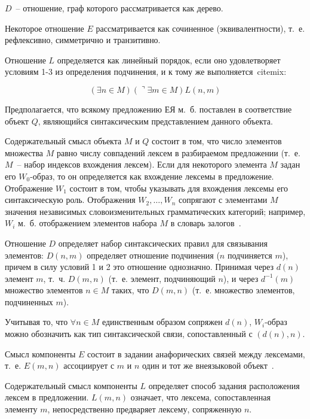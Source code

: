 \documentclass[a4paper,14pt,russian]{extreport}
\begin{document}
$D$~-- отношение, граф которого рассматривается как дерево.

Некоторое отношение $E$ рассматривается как сочиненное (эквивалентности), т.~е. рефлексивно, симметрично и транзитивно.

Отношение $L$ определяется как линейный порядок, если оно удовлетворяет условиям 1-3 из определения подчинения, и к тому же выполняется~cite{mix}:

$$
\left(\exists n\in M\right)\left(\urcorner\exists m\in M\right)L\left(n, m\right)
$$

Предполагается, что всякому предложению ЕЯ м.~б. поставлен в соответствие объект $Q$, являющийся синтаксическим представлением данного объекта.

Содержательный смысл объекта $M$ и $Q$ состоит в том, что число элементов множества $M$ равно числу совпадений лексем в разбираемом предложении (т.~е. $M$~-- набор индексов вхождения лексем). Если для некоторого элемента $M$ задан его $W_0$-образ, то он определяется как вхождение лексемы в предложение. Отображение $W_1$ состоит в том, чтобы указывать для вхождения лексемы его синтаксическую роль. Отображения $W_2,\dots,W_n$ сопрягают с элементами $M$ значения независимых словоизменительных грамматических категорий; например, $W_i$ м.~б. отображением элементов набора $M$ в словарь залогов~\cite{mix}.

Отношение $D$ определяет набор синтаксических правил для связывания элементов: $D\left(n, m\right)$ определяет отношение подчинения ($n$ подчиняется $m$), причем в силу условий 1 и 2 это отношение однозначно. Принимая через $d\left(n\right)$ элемент $m$, т.~ч. $D\left(m, n\right)$ (т.~е. элемент, подчиняющий $n$), и через $d^{-1}\left(m\right)$ множество элементов $n\in M$ таких, что $D\left(m, n\right)$ (т.~е. множество элементов, подчиненных $m$).

Учитывая то, что $\forall n\in M$ единственным образом сопряжен $d\left(n\right)$, $W_i$-образ можно обозначить как тип синтаксической связи, сопоставленный с $\left(d\left(n\right),n\right)$.

Смысл компоненты $E$ состоит в задании анафорических связей между лексемами, т.~е. $E\left(m, n\right)$ ассоциирует с $m$ и $n$ один и тот же внеязыковой объект~\cite{mix}.

Содержательный смысл компоненты $L$ определяет способ задания расположения лексем в предложении. $L\left(m, n\right)$ означает, что лексема, сопоставленная элементу $m$, непосредственно предваряет лексему, сопряженную $n$.
\end{document}
